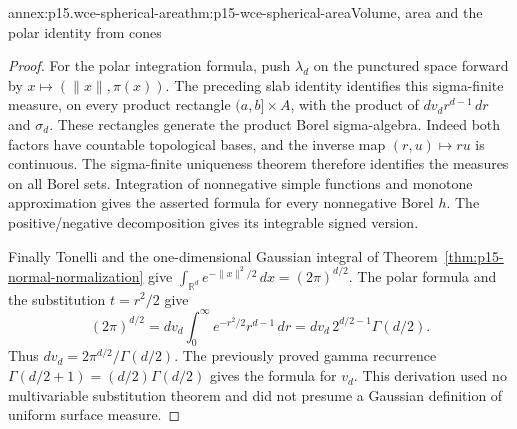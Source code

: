 \begin{annexitem}{annex:p15.wce-spherical-area}{thm:p15-wce-spherical-area}{Volume, area and the polar identity from cones}
\begin{proof}
For the polar integration formula, push \(\lambda_d\) on the
punctured space forward by \(x\mapsto(\|x\|,\pi(x))\).
The preceding slab identity identifies this sigma-finite measure,
on every product rectangle \((a,b]\times A\), with the product of
\(d v_d r^{d-1}\,dr\) and \(\sigma_d\).
These rectangles generate the product Borel sigma-algebra.
Indeed both factors have countable topological bases, and
the inverse map \((r,u)\mapsto ru\) is continuous.
The sigma-finite uniqueness theorem therefore identifies the
measures on all Borel sets. Integration of nonnegative simple
functions and monotone approximation gives the asserted formula
for every nonnegative Borel \(h\). The positive/negative
decomposition gives its integrable signed version.

Finally Tonelli and the one-dimensional Gaussian integral
of Theorem~\ref{thm:p15-normal-normalization} give
\(\int_{\mathbb R^d}e^{-\|x\|^2/2}\,dx=(2\pi)^{d/2}\).
The polar formula and the substitution \(t=r^2/2\) give
\[
 (2\pi)^{d/2}
 =d v_d\int_0^\infty e^{-r^2/2}r^{d-1}\,dr
 =d v_d\,2^{d/2-1}\Gamma(d/2).
 \]
Thus \(d v_d=2\pi^{d/2}/\Gamma(d/2)\).
The previously proved gamma recurrence
\(\Gamma(d/2+1)=(d/2)\Gamma(d/2)\) gives the formula for \(v_d\).
This derivation used no multivariable substitution theorem and
did not presume a Gaussian definition of uniform surface measure.
\end{proof}
\end{annexitem}

